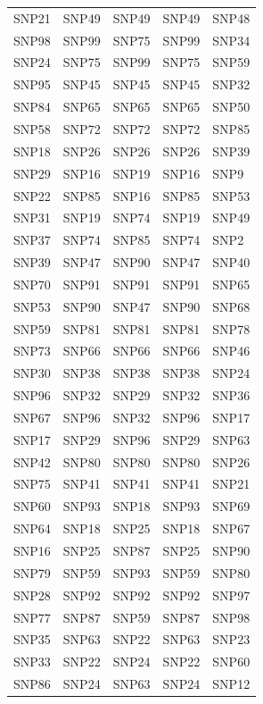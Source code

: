 \begin{table}[ht]
\begin{tabular}{lllll}
  SNP21 & SNP49 & SNP49 & SNP49 & SNP48 \\ 
  SNP98 & SNP99 & SNP75 & SNP99 & SNP34 \\ 
  SNP24 & SNP75 & SNP99 & SNP75 & SNP59 \\ 
  SNP95 & SNP45 & SNP45 & SNP45 & SNP32 \\ 
  SNP84 & SNP65 & SNP65 & SNP65 & SNP50 \\ 
  SNP58 & SNP72 & SNP72 & SNP72 & SNP85 \\ 
  SNP18 & SNP26 & SNP26 & SNP26 & SNP39 \\ 
  SNP29 & SNP16 & SNP19 & SNP16 & SNP9 \\ 
  SNP22 & SNP85 & SNP16 & SNP85 & SNP53 \\ 
  SNP31 & SNP19 & SNP74 & SNP19 & SNP49 \\ 
  SNP37 & SNP74 & SNP85 & SNP74 & SNP2 \\ 
  SNP39 & SNP47 & SNP90 & SNP47 & SNP40 \\ 
  SNP70 & SNP91 & SNP91 & SNP91 & SNP65 \\ 
  SNP53 & SNP90 & SNP47 & SNP90 & SNP68 \\ 
  SNP59 & SNP81 & SNP81 & SNP81 & SNP78 \\ 
  SNP73 & SNP66 & SNP66 & SNP66 & SNP46 \\ 
  SNP30 & SNP38 & SNP38 & SNP38 & SNP24 \\ 
  SNP96 & SNP32 & SNP29 & SNP32 & SNP36 \\ 
  SNP67 & SNP96 & SNP32 & SNP96 & SNP17 \\ 
  SNP17 & SNP29 & SNP96 & SNP29 & SNP63 \\ 
  SNP42 & SNP80 & SNP80 & SNP80 & SNP26 \\ 
  SNP75 & SNP41 & SNP41 & SNP41 & SNP21 \\ 
  SNP60 & SNP93 & SNP18 & SNP93 & SNP69 \\ 
  SNP64 & SNP18 & SNP25 & SNP18 & SNP67 \\ 
  SNP16 & SNP25 & SNP87 & SNP25 & SNP90 \\ 
  SNP79 & SNP59 & SNP93 & SNP59 & SNP80 \\ 
  SNP28 & SNP92 & SNP92 & SNP92 & SNP97 \\ 
  SNP77 & SNP87 & SNP59 & SNP87 & SNP98 \\ 
  SNP35 & SNP63 & SNP22 & SNP63 & SNP23 \\ 
  SNP33 & SNP22 & SNP24 & SNP22 & SNP60 \\ 
  SNP86 & SNP24 & SNP63 & SNP24 & SNP12 \\ 

\end{tabular}
\end{table}

